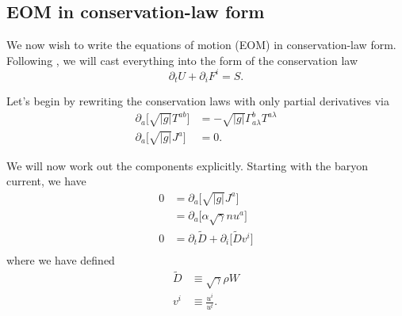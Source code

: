 \documentclass[12pt]{article}
\numberwithin{equation}{section}
\begin{document}
\subsection{EOM in conservation-law form}

We now wish to write the equations of motion (EOM) in conservation-law form.
Following \cite{BaumgarteShapiro}, we will cast everything into the form of the conservation law
\begin{equation}
\partial_t U + \partial_i F^{i} = S.
\end{equation}

Let's begin by rewriting the conservation laws with only partial derivatives via
\begin{align}
\partial_a \big[ \sqrt{|g|} T^{ab} \big] &= -\sqrt{|g|} \Gamma^{b}_{a \lambda} T^{a \lambda} \\
\partial_a \big[ \sqrt{|g|} J^{a} \big] &= 0.
\end{align}

We will now work out the components explicitly.
Starting with the baryon current, we have
\begin{equation}
\begin{aligned}
0 &= \partial_a \big[ \sqrt{|g|} J^{a} \big] \\
&= \partial_a \big[ \alpha \sqrt{\gamma} n u^a \big] \\
0 &= \partial_t \tilde{D} + \partial_i \big[ \tilde{D} v^i \big] \\
\end{aligned}
\end{equation}
where we have defined
\begin{equation}
\begin{aligned}
\tilde{D} &\equiv \sqrt{\gamma} \rho W \\
v^{i} &\equiv \frac{u^i}{u^t}.
\end{aligned}
\end{equation}
\end{document}
